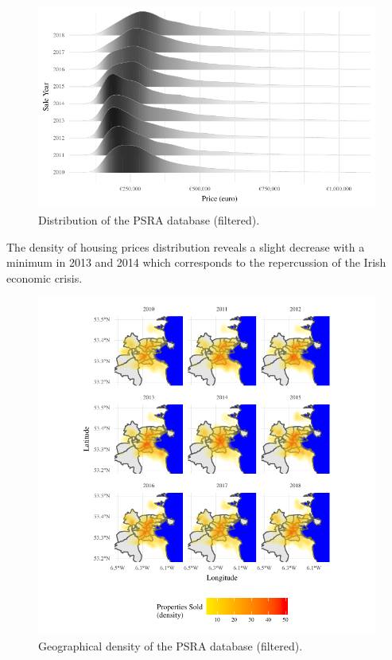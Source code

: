 \documentclass[]{elsarticle} %
\begin{document}
\begin{figure}[H]
\includegraphics{property_price_paper_new_files/figure-latex/distrib-plot-1} \caption{Distribution of the PSRA database (filtered).}\label{fig:distrib-plot}
\end{figure}

The density of housing prices distribution reveals a slight decrease
with a minimum in 2013 and 2014 which corresponds to the repercussion of
the Irish economic crisis.

\begin{figure}[H]
\includegraphics{property_price_paper_new_files/figure-latex/density-plot-1} \caption{Geographical density of the PSRA database (filtered).}\label{fig:density-plot}
\end{figure}
\end{document}
